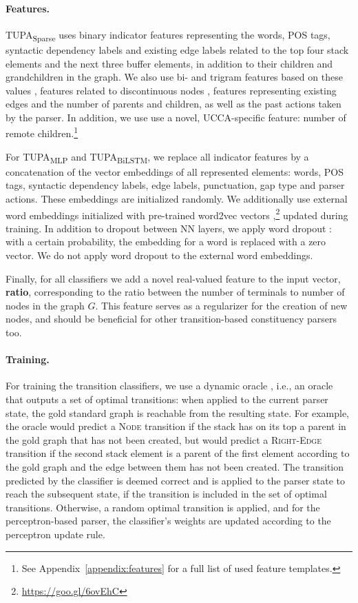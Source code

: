\documentclass[11pt,a4paper]{article}
\newcommand{\parser}[1]{TUPA\textsubscript{#1}}
\begin{document}
\paragraph{Features.}
\parser{Sparse} uses binary indicator features representing
the words, POS tags, syntactic dependency labels and
existing edge labels related to the top four stack elements and the 
next three buffer elements, in addition to their children and grandchildren in the graph.
We also use bi- and trigram features based on these values \cite{zhang2009transition,zhu2013fast},
features related to discontinuous nodes
\cite[including separating punctuation and gap type]{maier2015discontinuous},
features representing existing edges and the number of parents and children,
as well as the past actions taken by the parser.
In addition, we use use a novel, UCCA-specific feature:
number of remote children.\footnote{See
Appendix~\ref{appendix:features} for a full list of used feature templates.}

For \parser{MLP} and \parser{BiLSTM},
we replace all indicator features by a
concatenation of the vector embeddings of all represented elements:
words, POS tags, syntactic dependency labels, edge labels, punctuation, gap type and parser actions.
These embeddings are initialized randomly.
We additionally use external word embeddings initialized with
pre-trained word2vec vectors \cite{mikolov2013efficient},\footnote{\url{
https://goo.gl/6ovEhC}} updated during training.
In addition to dropout between NN layers, we apply word dropout 
\cite{kiperwasser2016simple}: with a certain probability, the embedding for a
word is replaced with a zero vector. We do not apply word dropout to the external
word embeddings.

Finally, for all classifiers we add a novel real-valued feature to the input vector,
\textbf{ratio}, corresponding to the ratio between the number of terminals to number of nodes
in the graph $G$.
This feature serves as a regularizer for the creation of new nodes,
and should be beneficial for other transition-based constituency parsers too.

\paragraph{Training.}
For training the transition classifiers, we use a dynamic oracle \cite{goldberg2012dynamic},
i.e., an oracle that outputs a set of optimal transitions: when
applied to the current parser state, the gold
standard graph is reachable from the resulting state.
For example, the oracle would predict a \textsc{Node} transition if the stack 
has on its top a parent in the gold graph that has not been created,
but would predict a \textsc{Right-Edge} transition if the second stack
element is a parent of the
first element according to the gold graph and the edge between them has not been created.
The transition predicted by the classifier is deemed correct
and is applied to the parser state to reach the subsequent state,
if the transition is included in the set of optimal transitions.
Otherwise, a random optimal transition is applied,
and for the perceptron-based parser, the classifier's weights are updated according
to the perceptron update rule.
\end{document}
